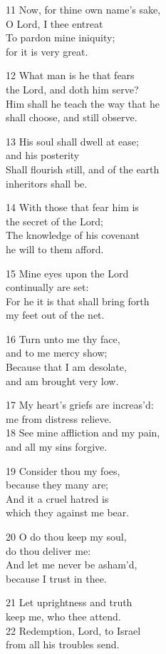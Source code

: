 \begin{multicols}{3}
11 Now, for thine own name’s sake,\\
O Lord, I thee entreat\\
To pardon mine iniquity;\\
for it is very great.

12 What man is he that fears\\
the Lord, and doth him serve?\\
Him shall he teach the way that he\\
shall choose, and still observe.

13 His soul shall dwell at ease;\\
and his posterity\\
Shall flourish still, and of the earth\\
inheritors shall be.

14 With those that fear him is\\
the secret of the Lord;\\
The knowledge of his covenant\\
he will to them afford.

15 Mine eyes upon the Lord\\
continually are set:\\
For he it is that shall bring forth\\
my feet out of the net.

16 Turn unto me thy face,\\
and to me mercy show;\\
Because that I am desolate,\\
and am brought very low.

17 My heart’s griefs are increas’d:\\
me from distress relieve.\\
18 See mine affliction and my pain,\\
and all my sins forgive.

19 Consider thou my foes,\\
because they many are;\\
And it a cruel hatred is\\
which they against me bear.

20 O do thou keep my soul,\\
do thou deliver me:\\
And let me never be asham’d,\\
because I trust in thee.

21 Let uprightness and truth\\
keep me, who thee attend.\\
22 Redemption, Lord, to Israel\\
from all his troubles send.


\end{multicols}
